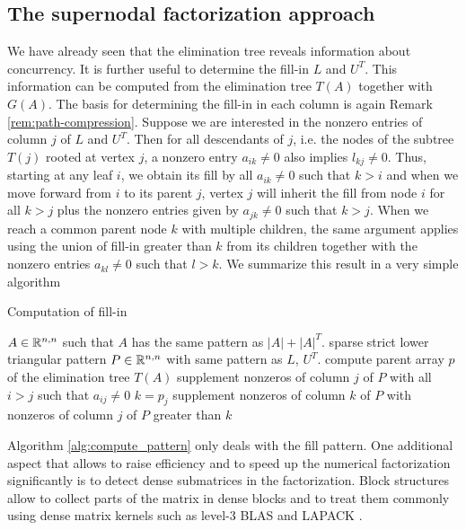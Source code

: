\subsection{The supernodal factorization approach}
We have already seen that the elimination tree reveals information about
concurrency. It is further useful to determine the fill-in $L$ and $U^T$.
This information can be computed from the elimination tree $T(A)$ together
with $G(A)$. The basis for determining the fill-in in each column is 
again Remark \ref{rem:path-compression}. Suppose we are interested in the
nonzero entries of column $j$ of $L$ and $U^T$. Then for all descendants of $j$,
i.e. the nodes of the subtree $T(j)$ rooted at vertex $j$, a nonzero entry
$a_{ik}\not=0$ also implies $l_{kj}\not=0$. Thus, starting at any leaf $i$,
we obtain its fill by all $a_{ik}\not=0$ such that $k>i$ and when we move forward
from $i$ to its parent $j$, vertex $j$ will inherit the fill from node $i$ for
all $k>j$ plus the nonzero entries given by $a_{jk}\not=0$ such that $k>j$.
When we reach a common parent node $k$ with multiple children, the same argument
applies using the union of fill-in greater than $k$ from its children together
with the nonzero entries $a_{kl}\not=0$ such that $l>k$.
We summarize this result in a very simple algorithm
\begin{programcode}{Computation of fill-in}\label{alg:compute_pattern}
\begin{algorithmic}[1]
  \Require $A\in\mathbb{R}^{n,n}$ such that $A$ has the same pattern as $|A|+|A|^T$.
  \Ensure sparse strict lower triangular pattern $P\in\mathbb{R}^{n,n}$ with
  same pattern as $L$, $U^T$.
  \State compute parent array $p$ of the elimination tree $T(A)$
      \State supplement nonzeros of column $j$ of $P$ with all $i>j$ such that $a_{ij}\not=0$ 
      \State $k=p_j$
         \State supplement nonzeros of column $k$ of $P$ with nonzeros of column $j$ of $P$ greater than $k$
      \EndIf   
  \EndFor
\end{algorithmic}
\end{programcode}



Algorithm \ref{alg:compute_pattern} only deals with the fill pattern. 
One additional aspect that allows to raise efficiency
and to speed up the numerical factorization significantly 
is to detect dense submatrices in the factorization.
Block structures  allow to collect parts
of the matrix in dense blocks and to treat them commonly using 
dense matrix kernels such as level-3 BLAS and LAPACK \cite{DodL85,DonDHH88}.

